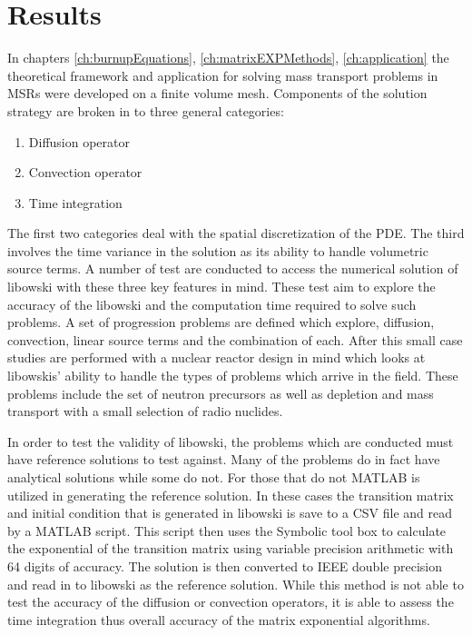 \chapter{Results}\label{ch:results}

In chapters \ref{ch:burnupEquations}, \ref{ch:matrixEXPMethods}, \ref{ch:application} the theoretical framework and application for solving mass transport problems in MSRs were developed on a finite volume mesh. Components of the solution strategy are broken in to three general categories:

\begin{enumerate}
    \item Diffusion operator
    \item Convection operator
    \item Time integration
\end{enumerate}

\noindent The first two categories deal with the spatial discretization of the PDE. The third involves the time variance in the solution as its ability to handle volumetric source terms. A number of test are conducted to access the numerical solution of libowski with these three key features in mind. These test aim to explore the accuracy of the libowski and the computation time required to solve such problems. A set of progression problems are defined which explore, diffusion, convection, linear source terms and the combination of each. After this small case studies are performed with a nuclear reactor design in mind which looks at libowskis' ability to handle the types of problems which arrive in the field. These problems include the set of neutron precursors as well as depletion and mass transport with a small selection of radio nuclides. 

In order to test the validity of libowski, the problems which are conducted must have reference solutions to test against. Many of the problems do in fact have analytical solutions while some do not. For those that do not MATLAB is utilized in generating the reference solution. In these cases the transition matrix and initial condition that is generated in libowski is save to a CSV file and read by a MATLAB script. This script then uses the Symbolic tool box to calculate the exponential of the transition matrix using variable precision arithmetic with 64 digits of accuracy. The solution is then converted to IEEE double precision and read in to libowski as the reference solution. While this method is not able to test the accuracy of the diffusion or convection operators, it is able to assess the time integration thus overall accuracy of the matrix exponential algorithms. 

